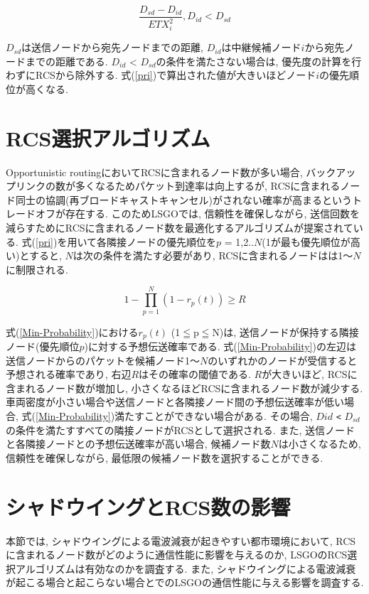 \documentclass[10pt]{jreport}
\begin{document}
\begin{equation}
	\label{pri}
	\frac{D_{sd} - D_{id}}{ETX_{i}^{2}} ,   D_{id} < D_{sd}
\end{equation}

$D_{sd}$は送信ノードから宛先ノードまでの距離, $D_{id}$は中継候補ノード$i$から宛先ノードまでの距離である.  $D_{id}$ < $D_{sd}$の条件を満たさない場合は, 優先度の計算を行わずにRCSから除外する.
式(\ref{pri})で算出された値が大きいほどノード$i$の優先順位が高くなる. 

\section{RCS選択アルゴリズム}
Opportunistic routingにおいてRCSに含まれるノード数が多い場合, バックアップリンクの数が多くなるためパケット到達率は向上するが, RCSに含まれるノード同士の協調(再ブロードキャストキャンセル)がされない確率が高まるというトレードオフが存在する.  
このためLSGOでは, 信頼性を確保しながら, 送信回数を減らすためにRCSに含まれるノード数を最適化するアルゴリズムが提案されている.  
式(\ref{pri})を用いて各隣接ノードの優先順位を$p$ = 1,2..$N$(1が最も優先順位が高い)とすると, $N$は次の条件を満たす必要があり, RCSに含まれるノードはは1～$N$に制限される. 

\begin{equation}
	\label{Min-Probability}
	1 - \prod_{p=1}^N (1 - r_{p}(t))\geq R
\end{equation}

式(\ref{Min-Probability})における$r_{p}(t)$ (1$ \leqq $p$ \leqq $N)は, 送信ノードが保持する隣接ノード(優先順位$p$)に対する予想伝送確率である. 
式(\ref{Min-Probability})の左辺は送信ノードからのパケットを候補ノード1～$N$のいずれかのノードが受信すると予想される確率であり, 右辺$R$はその確率の閾値である. $R$が大きいほど, RCSに含まれるノード数が増加し, 小さくなるほどRCSに含まれるノード数が減少する. 車両密度が小さい場合や送信ノードと各隣接ノード間の予想伝送確率が低い場合, 式(\ref{Min-Probability})満たすことができない場合がある. その場合, $D{id}$ \verb|<| $D_{sd}$の条件を満たすすべての隣接ノードがRCSとして選択される. また, 送信ノードと各隣接ノードとの予想伝送確率が高い場合, 候補ノード数$N$は小さくなるため, 信頼性を確保しながら, 最低限の候補ノード数を選択することができる. 


\section{シャドウイングとRCS数の影響}
\label{LSGO_evaluation}

本節では, シャドウイングによる電波減衰が起きやすい都市環境において, RCSに含まれるノード数がどのように通信性能に影響を与えるのか, LSGOのRCS選択アルゴリズムは有効なのかを調査する.
また, シャドウイングによる電波減衰が起こる場合と起こらない場合とでのLSGOの通信性能に与える影響を調査する.
\end{document}
